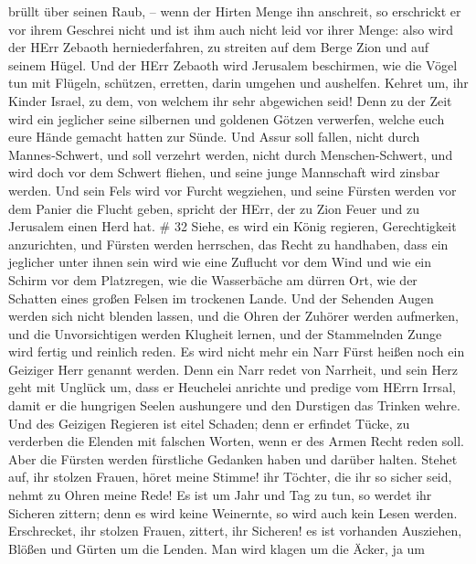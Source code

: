 brüllt über seinen Raub, -- wenn der Hirten Menge ihn anschreit, so
erschrickt er vor ihrem Geschrei nicht und ist ihm auch nicht leid vor
ihrer Menge: also wird der HErr Zebaoth herniederfahren, zu streiten auf
dem Berge Zion und auf seinem Hügel.  Und der HErr Zebaoth
wird Jerusalem beschirmen, wie die Vögel tun mit Flügeln, schützen,
erretten, darin umgehen und aushelfen.  Kehret um, ihr
Kinder Israel, zu dem, von welchem ihr sehr abgewichen seid!
 Denn zu der Zeit wird ein jeglicher seine silbernen und
goldenen Götzen verwerfen, welche euch eure Hände gemacht hatten zur
Sünde.  Und Assur soll fallen, nicht durch Mannes-Schwert,
und soll verzehrt werden, nicht durch Menschen-Schwert, und wird doch
vor dem Schwert fliehen, und seine junge Mannschaft wird zinsbar werden.
 Und sein Fels wird vor Furcht wegziehen, und seine Fürsten
werden vor dem Panier die Flucht geben, spricht der HErr, der zu Zion
Feuer und zu Jerusalem einen Herd hat. \# 32  Siehe, es wird
ein König regieren, Gerechtigkeit anzurichten, und Fürsten werden
herrschen, das Recht zu handhaben,  dass ein jeglicher unter
ihnen sein wird wie eine Zuflucht vor dem Wind und wie ein Schirm vor
dem Platzregen, wie die Wasserbäche am dürren Ort, wie der Schatten
eines großen Felsen im trockenen Lande.  Und der Sehenden
Augen werden sich nicht blenden lassen, und die Ohren der Zuhörer werden
aufmerken,  und die Unvorsichtigen werden Klugheit lernen,
und der Stammelnden Zunge wird fertig und reinlich reden. 
Es wird nicht mehr ein Narr Fürst heißen noch ein Geiziger Herr genannt
werden.  Denn ein Narr redet von Narrheit, und sein Herz
geht mit Unglück um, dass er Heuchelei anrichte und predige vom HErrn
Irrsal, damit er die hungrigen Seelen aushungere und den Durstigen das
Trinken wehre.  Und des Geizigen Regieren ist eitel Schaden;
denn er erfindet Tücke, zu verderben die Elenden mit falschen Worten,
wenn er des Armen Recht reden soll.  Aber die Fürsten werden
fürstliche Gedanken haben und darüber halten.  Stehet auf,
ihr stolzen Frauen, höret meine Stimme! ihr Töchter, die ihr so sicher
seid, nehmt zu Ohren meine Rede!  Es ist um Jahr und Tag zu
tun, so werdet ihr Sicheren zittern; denn es wird keine Weinernte, so
wird auch kein Lesen werden.  Erschrecket, ihr stolzen
Frauen, zittert, ihr Sicheren! es ist vorhanden Ausziehen, Blößen und
Gürten um die Lenden.  Man wird klagen um die Äcker, ja um
